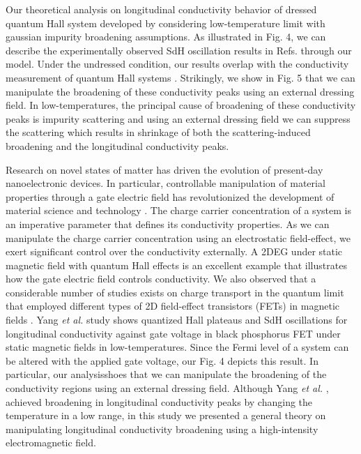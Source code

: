 \documentclass{article}
\begin{document}
\begin{itemize}
{  Our theoretical analysis on longitudinal conductivity behavior of dressed quantum Hall system developed by considering low-temperature limit with gaussian impurity broadening assumptions.
  As illustrated in Fig. 4, we can describe the experimentally observed SdH oscillation results in Refs.\cite{endo09,wakabayashi78} through our model.
  Under the undressed condition, our results overlap with the conductivity measurement of quantum Hall systems \cite{endo09}. Strikingly, we show in Fig. 5 that we can manipulate the broadening of these conductivity peaks using an external dressing field. In low-temperatures, the principal cause of broadening of these conductivity peaks is impurity scattering and using an external dressing field we can suppress the scattering which results in shrinkage of both the scattering-induced broadening and the longitudinal conductivity peaks.

  Research on novel states of matter has driven the evolution of present-day nanoelectronic devices. In particular, controllable manipulation of material properties through a gate electric field has revolutionized the development of material science and technology \cite{ahn03,deng18}.
  The charge carrier concentration of a system is an imperative parameter that defines its conductivity properties.
  As we can manipulate the charge carrier concentration using an electrostatic field-effect, we exert significant control over the conductivity externally.
  A 2DEG under static magnetic field with quantum Hall effects is an excellent example that illustrates how the gate electric field controls conductivity.
  We also observed that a considerable number of studies exists on charge transport in the quantum limit that employed different types of 2D field-effect transistors (FETs) in magnetic fields \cite{wakabayashi78,yang18,long20,li14}. Yang \textit{et al.} \cite{yang18} study shows quantized Hall plateaus and SdH oscillations for longitudinal conductivity against gate voltage in black phosphorus FET under static magnetic fields in low-temperatures. Since the Fermi level of a system can be altered with the applied gate voltage, our Fig. 4 depicts this result.
  In particular, our analysisshoes that we can manipulate the broadening of the conductivity regions using an external dressing field. Although Yang \textit{et al.} \cite{yang18}, achieved broadening in longitudinal conductivity peaks by changing the temperature in a low range, in this study we presented a general theory on manipulating longitudinal conductivity broadening using a high-intensity electromagnetic field.

}
\end{itemize}
\end{document}
